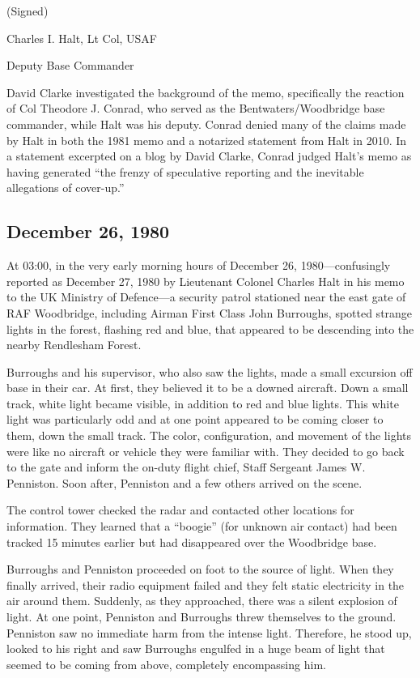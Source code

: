 \begin{svgraybox}
(Signed)

Charles I. Halt, Lt Col, USAF

Deputy Base Commander
\end{svgraybox}

David Clarke investigated the background of the memo, specifically the reaction of Col Theodore J. Conrad,
who served as the Bentwaters/Woodbridge base commander, while Halt was his deputy.
Conrad denied many of the claims made by Halt in both the 1981 memo and a notarized statement from Halt in 2010. In a statement excerpted on a blog by David Clarke, Conrad judged Halt's memo as having generated
``the frenzy of speculative reporting and the inevitable allegations of cover-up.''



\subsection{December 26, 1980}

At 03:00, in the very early morning hours of December 26,
1980---confusingly reported as December 27, 1980 by Lieutenant Colonel Charles Halt in his memo to the UK Ministry of Defence---a
security patrol stationed near the east gate of RAF
Woodbridge, including
Airman First Class John Burroughs, spotted strange lights in the forest, flashing red and blue,
that appeared to be descending into the nearby Rendlesham Forest.

Burroughs
and his supervisor, who also saw the lights, made a small excursion off base in their car.
At first, they believed it to be a downed aircraft.
Down a small track, white light became visible, in addition to red and blue lights.
This white light was particularly odd and at one point appeared to be coming closer to them, down the small track.
The color, configuration, and movement
of the lights were like no aircraft or vehicle they were familiar with.
They decided to go back to the gate and inform the
on-duty flight chief, Staff Sergeant James W. Penniston.
Soon after, Penniston and a few others arrived on the scene.

The control tower checked the radar and contacted other locations for information. They learned that a ``boogie'' (for unknown air contact)
had been tracked 15 minutes earlier but had disappeared over the Woodbridge base.

Burroughs and Penniston proceeded on foot to the source of light. When they finally arrived, their radio equipment failed and
they felt static electricity in the air around them.
Suddenly, as they approached, there was a silent explosion of light.
At one point, Penniston and Burroughs threw themselves to the ground.
Penniston saw no immediate harm from the intense light. Therefore, he stood up, looked to his right and saw Burroughs
engulfed in a huge beam of light that seemed to be coming from above, completely encompassing him.

